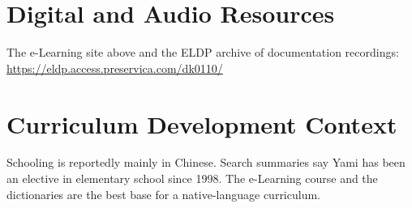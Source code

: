\documentclass[12pt]{article}
\begin{document}
\section{Digital and Audio Resources}
The e-Learning site above and the ELDP archive of documentation recordings: \url{https://eldp.access.preservica.com/dk0110/}
\section{Curriculum Development Context}
Schooling is reportedly mainly in Chinese. Search summaries say Yami has been an elective in elementary school since 1998. The e-Learning course and the dictionaries are the best base for a native-language curriculum.
\end{document}
